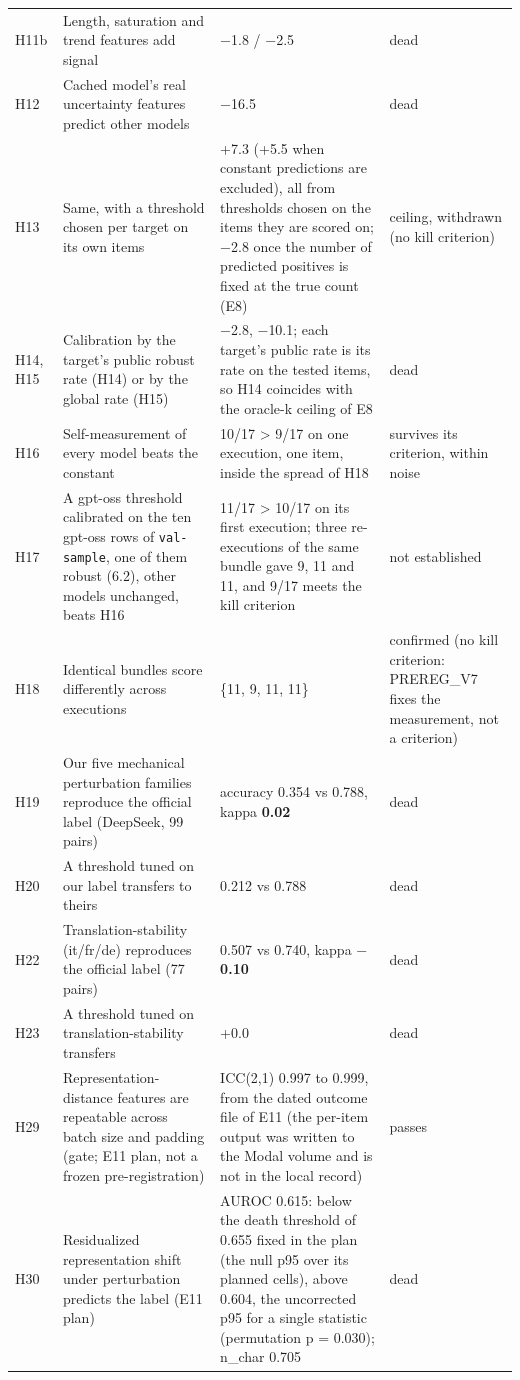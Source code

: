 {\begin{longtable}{L{1.1cm}L{3.7cm}L{5.7cm}L{2.2cm}}
H11b & Length, saturation and trend features add signal & $-$1.8 / $-$2.5 & dead \\
H12 & Cached model's real uncertainty features predict other models & $-$16.5 & dead \\
H13 & Same, with a threshold chosen per target on its own items & +7.3 (+5.5 when constant predictions are excluded), all from thresholds chosen on the items they are scored on; $-$2.8 once the number of predicted positives is fixed at the true count (E8) & ceiling, withdrawn (no kill criterion) \\
H14, H15 & Calibration by the target's public robust rate (H14) or by the global rate (H15) & $-$2.8, $-$10.1; each target's public rate is its rate on the tested items, so H14 coincides with the oracle-k ceiling of E8 & dead \\
H16 & Self-measurement of every model beats the constant & 10/17 > 9/17 on one execution, one item, inside the spread of H18 & survives its criterion, within noise \\
H17 & A gpt-oss threshold calibrated on the ten gpt-oss rows of \texttt{val-sample}, one of them robust (6.2), other models unchanged, beats H16 & 11/17 > 10/17 on its first execution; three re-executions of the same bundle gave 9, 11 and 11, and 9/17 meets the kill criterion & not established \\
H18 & Identical bundles score differently across executions & \{11, 9, 11, 11\} & confirmed (no kill criterion: PREREG\_V7 fixes the measurement, not a criterion) \\
H19 & Our five mechanical perturbation families reproduce the official label (DeepSeek, 99 pairs) & accuracy 0.354 vs 0.788, kappa \textbf{0.02} & dead \\
H20 & A threshold tuned on our label transfers to theirs & 0.212 vs 0.788 & dead \\
H22 & Translation-stability (it/fr/de) reproduces the official label (77 pairs) & 0.507 vs 0.740, kappa \textbf{$-$0.10} & dead \\
H23 & A threshold tuned on translation-stability transfers & +0.0 & dead \\
H29 & Representation-distance features are repeatable across batch size and padding (gate; E11 plan, not a frozen pre-registration) & ICC(2,1) 0.997 to 0.999, from the dated outcome file of E11 (the per-item output was written to the Modal volume and is not in the local record) & passes \\
H30 & Residualized representation shift under perturbation predicts the label (E11 plan) & AUROC 0.615: below the death threshold of 0.655 fixed in the plan (the null p95 over its planned cells), above 0.604, the uncorrected p95 for a single statistic (permutation p = 0.030); n\_char 0.705 & dead \\

\end{longtable}}
